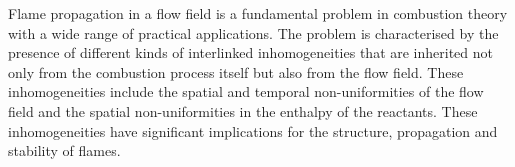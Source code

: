 Flame propagation in a flow field is a fundamental problem in combustion theory with a wide range of practical applications. The problem is characterised by the presence of different kinds of interlinked inhomogeneities that are inherited not only from the combustion process itself but also from the flow field. These inhomogeneities include the spatial and temporal non-uniformities of the flow field and the spatial non-uniformities in the enthalpy of the reactants. These inhomogeneities have significant implications for the structure, propagation and stability of flames. 